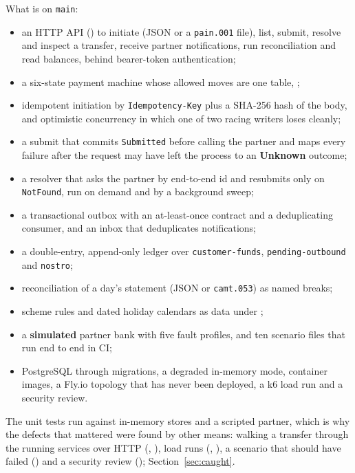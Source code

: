 \documentclass[11pt,a4paper]{article}
\begin{document}
What is on \texttt{main}:
\begin{itemize}[leftmargin=1.4em]
  \item an HTTP API () to initiate (JSON or a \texttt{pain.001}
        file), list, submit, resolve and inspect a transfer, receive partner notifications, run
        reconciliation and read balances, behind bearer-token authentication;
  \item a six-state payment machine whose allowed moves are one table,
        ;
  \item idempotent initiation by \texttt{Idempotency-Key} plus a SHA-256 hash of the body, and
        optimistic concurrency in which one of two racing writers loses cleanly;
  \item a submit that commits \texttt{Submitted} before calling the partner and maps every
        failure after the request may have left the process to an \textbf{Unknown} outcome;
  \item a resolver that asks the partner by end-to-end id and resubmits only on
        \texttt{NotFound}, run on demand and by a background sweep;
  \item a transactional outbox with an at-least-once contract and a deduplicating consumer, and an
        inbox that deduplicates notifications;
  \item a double-entry, append-only ledger over \texttt{customer-funds},
        \texttt{pending-outbound} and \texttt{nostro};
  \item reconciliation of a day's statement (JSON or \texttt{camt.053}) as named breaks;
  \item scheme rules and dated holiday calendars as data under ;
  \item a \textbf{simulated} partner bank with five fault profiles, and ten scenario files that run
        end to end in CI;
  \item PostgreSQL through migrations, a degraded in-memory mode, container images, a Fly.io
        topology that has never been deployed, a k6 load run and a security review.
\end{itemize}

The unit tests run against in-memory stores and a scripted partner, which is why the defects that
mattered were found by other means: walking a transfer through the running services over HTTP
(, ), load runs (, ), a scenario that should have
failed () and a security review (); Section~\ref{sec:caught}.
\end{document}
